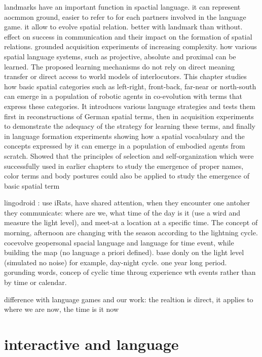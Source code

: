 \cite{spranger2013evolutionary} landmarks have an important function in spactial language. it can represent aocmmon ground, easier to refer to for each partners involved in the language game. it allow to evolve spatial relation. better with landmark than without. effect on success in communication and their impact on the
formation of spatial relations.
\cite{spranger2012emergent} \cite{spranger2013grounded} grounded acquisition experiments of increasing complexity. how various spatial language systems, such as projective, absolute and proximal can be learned. The proposed learning mechanisms do not rely on direct meaning transfer or direct access to world models of interlocutors.
\cite{spranger2012co} This chapter studies how basic spatial categories such as left-right, front-back, far-near or north-south can emerge in a population of robotic agents in co-evolution with terms that express these categories. It introduces various language strategies and tests them first in reconstructions of German spatial terms, then in acquisition experiments to demonstrate the adequacy of the strategy for learning these terms, and finally in language formation experiments showing how a spatial vocabulary and the concepts expressed by it can emerge in a population of embodied agents from scratch. Showed that the principles of selection and self-organization which were successfully used in earlier chapters to study the emergence of proper names, color terms and body postures could also be applied to study the emergence of basic spatial term

lingodroid \cite{schulz2010robots} : use iRats, have shared attention, when they encounter one antoher they communicate: where are we, what time of the day is it (use a wird and measure the light level), and meet-at a location at a specific time. The concept of morning, afternoon are changing with the season according to the lightning cycle. \cite{schulz2011lingodroids}
\cite{heath2012long} cocevolve geopersonal spacial language and language for time event, while building the map (no language a priori defined). base donly on the light level (simulated no noise) for example, day-night cycle. one year long period. gorunding words, concep of cyclic time throug experience wth events rather than by time or calendar.


difference with language games and our work: the realtion is direct, it applies to where we are now, the time is it now

\section{interactive and language}

